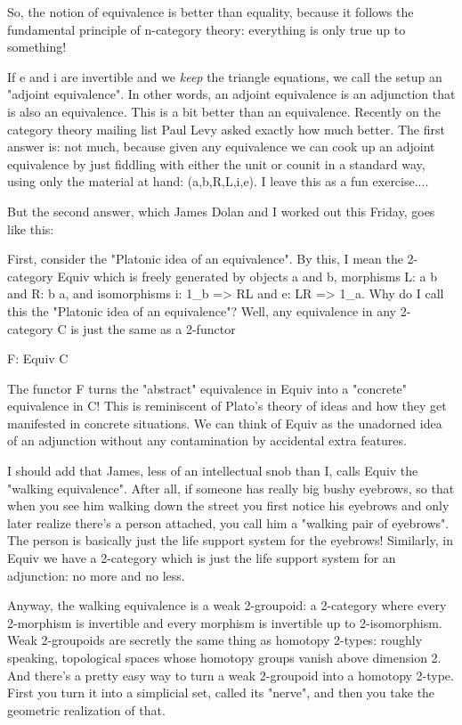 So, the notion of equivalence is better than equality, because it
follows the fundamental principle of n-category theory: everything is
only true up to something!


If e and i are invertible and we \emph{keep} the triangle equations,
we call the setup an "adjoint equivalence".  In other words,
an adjoint equivalence is an adjunction that is also an equivalence.
This is a bit better than an equivalence.  Recently on the category
theory mailing list Paul Levy asked exactly how much better.  The first
answer is: not much, because given any equivalence we can cook up an
adjoint equivalence by just fiddling with either the unit or counit in a
standard way, using only the material at hand: (a,b,R,L,i,e).  I leave
this as a fun exercise....

But the second answer, which James Dolan and I worked out this Friday,
goes like this:


First, consider the "Platonic idea of an equivalence".  By
this, I mean the 2-category Equiv which is freely generated by objects a
and b, morphisms L: a \to  b and R: b \to  a, and isomorphisms i:
1_{b} => RL and e: LR => 1_{a}.  Why do I call
this the "Platonic idea of an equivalence"?  Well, any
equivalence in any 2-category C is just the same as a 2-functor

F: Equiv \to  C

The functor F turns the "abstract" equivalence in Equiv into a
"concrete" equivalence in C!  This is reminiscent of Plato's theory
of ideas and how they get manifested in concrete situations.  We can
think of Equiv as the unadorned idea of an adjunction without any
contamination by accidental extra features.

I should add that James, less of an intellectual snob than I, calls
Equiv the "walking equivalence".  After all, if someone has
really big bushy eyebrows, so that when you see him walking down the
street you first notice his eyebrows and only later realize there's a
person attached, you call him a "walking pair of eyebrows".
The person is basically just the life support system for the eyebrows!
Similarly, in Equiv we have a 2-category which is just the life support
system for an adjunction: no more and no less.

Anyway, the walking equivalence is a weak 2-groupoid: a 2-category where
every 2-morphism is invertible and every morphism is invertible up to
2-isomorphism.  Weak 2-groupoids are secretly the same thing as homotopy
2-types: roughly speaking, topological spaces whose homotopy groups
vanish above dimension 2.  And there's a pretty easy way to turn a weak
2-groupoid into a homotopy 2-type.  First you turn it into a simplicial
set, called its "nerve", and then you take the geometric
realization of that.

